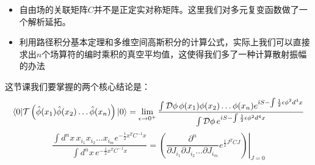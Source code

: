 \documentclass[CJK]{beamer}
\begin{document}
\begin{frame}
\bch
{\small
\begin{itemize}
\item{自由场的关联矩阵$C$并不是正定实对称矩阵。这里我们对多元复变函数做了一个解析延拓。}
\item{利用路径积分基本定理和多维空间高斯积分的计算公式，实际上我们可以直接求出$n$个场算符的编时乘积的真空平均值，这使得我们多了一种计算散射振幅的办法}
\end{itemize}
这节课我们要掌握的两个核心结论是：
$$\langle 0 | \mathcal{T}\left({\hat{\phi}}(x_1){\hat{\phi}}(x_2)\ldots{\hat{\phi}}(x_n)\right) |0\rangle = \lim_{\epsilon\rightarrow 0^+}\frac{\int {\mathcal{D}}\phi\, \phi(x_1)\phi(x_2)\ldots\phi(x_n) e^{{\dot{\imath}} S - \int\frac{1}{2}\epsilon\phi^2d^4x} }{\int {\mathcal{D}}\phi \, e^{{\dot{\imath}} S - \int \frac{1}{2}\epsilon\phi^2d^4x}}$$
$$\frac{\int d^nx\, x_{i_1}x_{i_2}\ldots x_{i_m} e^{-\frac{1}{2} x^T C^{-1}x }}{\int d^nx\, e^{-\frac{1}{2} x^T C^{-1}x  }} = \left.\left(\frac{\partial^n}{\partial J_{i_1}\partial J_{i_2}\ldots\partial J_{i_m}} e^{\frac{1}{2}J^TCJ}\right)\right\vert_{J=0}$$

}
\ech
\end{frame}
\end{document}
